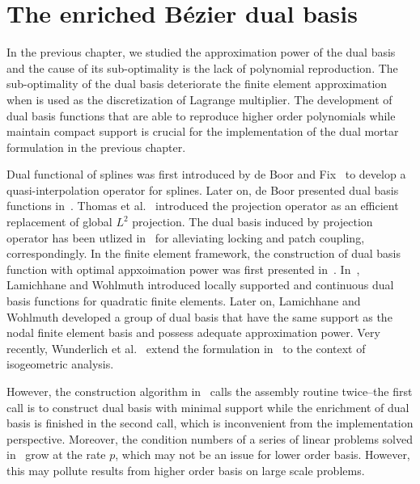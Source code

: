 \chapter{The enriched B\'ezier dual basis}
\label{chp:chapter4}
\graphicspath{{figures/}{figures/chapter4/}}



In the previous chapter, we studied the approximation power of the \Bezier dual basis and the cause of its sub-optimality is the lack of polynomial reproduction. The sub-optimality of the \Bezier dual basis deteriorate the finite element approximation when is used as the discretization of Lagrange multiplier. The development of dual basis functions that are able to reproduce higher order polynomials while maintain compact support is crucial for the implementation of the dual mortar formulation in the previous chapter.\par

Dual functional of splines was first introduced by de Boor and Fix~\cite{de1973spline} to develop a quasi-interpolation operator for splines. Later on, de Boor presented dual basis functions in~\cite{de1975local}. Thomas et al.~\cite{thomas2015bezier} introduced the \Bezier projection operator as an efficient replacement of global $L^2$ projection. The dual basis induced by \Bezier projection operator has been utlized in~\cite{MIAO2018273,zou2018isogeometric} for alleviating locking and patch coupling, correspondingly. In the finite element framework, the construction of dual basis function with optimal appxoimation power was first presented in~\cite{oswald2001polynomial}. In~\cite{lamichhane2002higher}, Lamichhane and Wohlmuth introduced locally supported and continuous dual basis functions for quadratic finite elements. Later on, Lamichhane and Wohlmuth developed a group of dual basis that have the same support as the nodal finite element basis and possess adequate approximation power. Very recently, Wunderlich et al.~\cite{wunderlich2019biorthogonal} extend the formulation in~\cite{oswald2001polynomial} to the context of isogeometric analysis.\par

However, the construction algorithm in~\cite{oswald2001polynomial} calls the assembly routine twice--the first call is to construct dual basis with minimal support while the enrichment of dual basis is finished in the second call, which is inconvenient from the implementation perspective. Moreover, the condition numbers of a series of linear problems solved in~\cite{oswald2001polynomial} grow at the rate $p$, which may not be an issue for lower order basis. However, this may pollute results from higher order basis on large scale problems. \par

